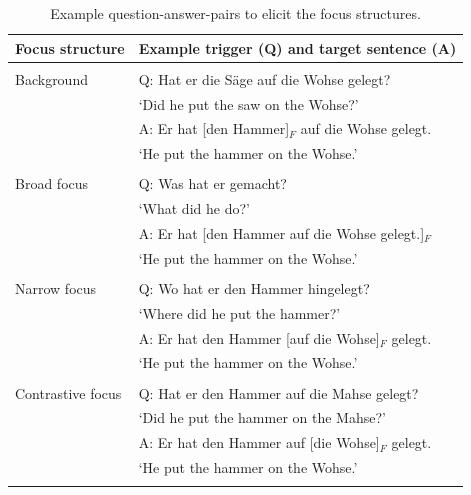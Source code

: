 \begin{table}
\caption{Example question-answer-pairs to elicit the focus structures.}
\label{tab:focus_trigger_target}
\begin{tabularx}{\textwidth}{l Q}
	\lsptoprule
Focus structure & Example trigger (Q) and target sentence (A) \\
\midrule
& \\
Background & Q: Hat er die Säge auf die Wohse gelegt? \\
& \hspace{5 mm}`Did he put the saw on the Wohse?' \\
& A: Er hat [den Hammer]$_F$ auf die Wohse gelegt. \\
& \hspace{5 mm}`He put the hammer on the Wohse.'\\
& \\
Broad focus & Q: Was hat er gemacht? \\
& \hspace{5 mm}`What did he do?' \\
& A: Er hat [den Hammer auf die Wohse gelegt.]$_F$ \\
& \hspace{5 mm}`He put the hammer on the Wohse.' \\
& \\
Narrow focus & Q: Wo hat er den Hammer hingelegt? \\
& \hspace{5 mm}`Where did he put the hammer?' \\
& A: Er hat den Hammer [auf die Wohse]$_F$ gelegt. \\
& \hspace{5 mm}`He put the hammer on the Wohse.' \\
& \\
Contrastive focus & Q: Hat er den Hammer auf die Mahse gelegt? \\
& \hspace{5 mm}`Did he put the hammer on the Mahse?' \\
& A: Er hat den Hammer auf [die Wohse]$_F$ gelegt. \\
& \hspace{5 mm}`He put the hammer on the Wohse.'\\
\lspbottomrule
\end{tabularx}
\end{table}

